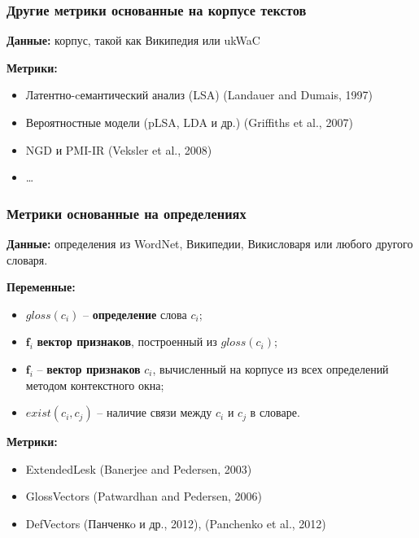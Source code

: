 \documentclass{beamer}
\begin{document}
\begin{frame}
\frametitle{Другие метрики основанные на корпусе текстов}

\textbf{Данные:} корпус, такой как Википедия или ukWaC
	
	
\textbf{Метрики:}
\begin{itemize}	
\item Латентно-cемантический анализ (LSA) (Landauer and Dumais, 1997)
\item Вероятностные модели (pLSA, LDA и др.) (Griffiths et al., 2007)
\item NGD и PMI-IR (Veksler et al., 2008)
\item \ldots
\end{itemize}
	
\end{frame}



\begin{frame}
\frametitle{Метрики основанные на определениях}

\textbf{Данные:} определения из WordNet, Википедии, Викисловаря или любого
другого словаря.
	
\textbf{Переменные:}
\begin{itemize}
		\item $gloss(c_i)$ -- \textbf{определение} слова $c_i$;
		\item $\mathbf{f}_i$ \textbf{вектор признаков}, построенный из $gloss(c_i)$;
		\item $\mathbf{f}_i$ -- \textbf{вектор признаков} $c_i$, вычисленный на
		корпусе из всех определений методом контекстного окна;
		
		\item $exist(c_i, c_j)$ -- наличие связи между $c_i$ и $c_j$ в словаре.
\end{itemize}

\textbf{Метрики:}
\begin{itemize}
  \item ExtendedLesk (Banerjee and Pedersen, 2003)
  \item GlossVectors (Patwardhan and Pedersen, 2006)
  \item DefVectors (Панченкo и др., 2012), (Panchenko et al., 2012)
  
\end{itemize}

\end{frame}
\end{document}
